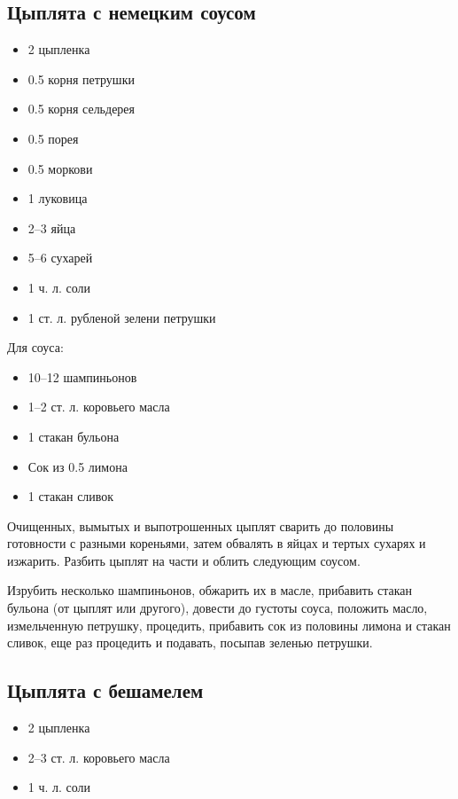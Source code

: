 \subsection{Цыплята с немецким соусом}

\begin{itemize}
	\item 2 цыпленка 
    \item 0.5 корня петрушки
    \item 0.5 корня сельдерея
    \item 0.5 порея 
    \item 0.5 моркови
    \item 1 луковица
    \item 2–3 яйца
    \item 5–6 сухарей
    \item 1 ч. л. соли 
    \item 1 ст. л. рубленой зелени петрушки
\end{itemize}

Для соуса: 

\begin{itemize}
	\item 10–12 шампиньонов
    \item 1–2 ст. л. коровьего масла
    \item 1 стакан бульона 
    \item Сок из 0.5 лимона
    \item 1 стакан сливок
\end{itemize}

Очищенных, вымытых и выпотрошенных цыплят сварить до половины готовности с разными кореньями, затем обвалять в яйцах и тертых сухарях и изжарить. Разбить цыплят на части и облить следующим соусом.

Изрубить несколько шампиньонов, обжарить их в масле, прибавить стакан бульона (от цыплят или другого), довести до густоты соуса, положить масло, измельченную петрушку, процедить, прибавить сок из половины лимона и стакан сливок, еще раз процедить и подавать, посыпав зеленью петрушки.

\subsection{Цыплята с бешамелем}

\begin{itemize}
	\item 2 цыпленка
    \item 2–3 ст. л. коровьего масла 
    \item 1 ч. л. соли
\end{itemize}

